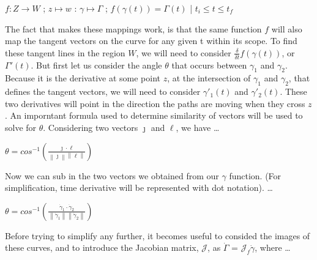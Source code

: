 \documentclass[a4paper,man,natbib]{apa6}
\begin{document}
\begin{center}

      $ f : Z \to W $ ; $ z \mapsto w $ : $ \gamma \mapsto \Gamma $ ; $ f(\gamma(t)) = \Gamma(t) $ | $ t_{i} \leq t \leq t_{f} $

\end{center}

The fact that makes these mappings work, is that the same function $ f $ will also map the tangent vectors on the curve for any given t within its scope.
To find these tangent lines in the region $ W $, we will need to consider $ \frac{\delta}{\delta t}f(\gamma(t)) $, or $ \Gamma'(t) $.
But first let us consider the angle $ \theta $ that occurs between $ \gamma_1 $ and $ \gamma_2 $. 
Because it is the derivative at some point $ z $, at the intersection of $ \gamma_1 $ and $ \gamma_2 $, that 
defines the tangent vectors, we will need to consider $ \gamma'_1(t) $ and $ \gamma'_2(t) $. These two derivatives will 
point in the direction the paths are moving when they cross $ z $. 
An imporntant formula used to determine similarity of vectors will be used to solve for $ \theta $.
Considering two vectors $ \jmath $ and $ \ell $, we have \dots

\begin{center}

      $ \theta = cos^{-1}(\frac{\jmath  \cdot \ell }{\left\lVert \jmath \right\rVert \left\lVert \ell  \right\rVert })$

\end{center}

Now we can sub in the two vectors we obtained from our $ \gamma $ function. (For simplification, time derivative will be represented with dot notation). \dots

\begin{center}

      $ \theta = cos^{-1}(\frac{\dot{\gamma}_1  \cdot \dot{\gamma}_2 }{\left\lVert \dot{\gamma}_1 \right\rVert \left\lVert \dot{\gamma}_2  \right\rVert })$

\end{center}

Before trying to simplify any further, it becomes useful to consided the images of these curves, and to introduce the Jacobian matrix, $ \mathcal{J} $, as $ \dot{\Gamma} $ = $ \mathcal{J}_f\dot{\gamma}$, where \dots
\end{document}
